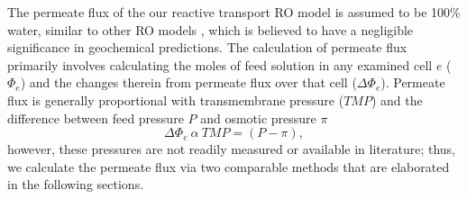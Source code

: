The permeate flux of the our reactive transport RO model is assumed to be 100\% water, similar to other RO models \cite{Li2012OptimalDesalination}, which is believed to have a negligible significance in geochemical predictions. The calculation of permeate flux primarily involves calculating the moles of feed solution in any examined cell $e$ ($\Phi_e$) and the changes therein from permeate flux over that cell ($\Delta \Phi_{e}$). Permeate flux is generally proportional with transmembrane pressure ($TMP$) and the difference between feed pressure $P$ and osmotic pressure $\pi$ \cite{VanWagner2009EffectPerformance,Schock1987MassModules,Lonsdale1965TransportMembranes}
\begin{equation} \label{pressure_differential}
    \Delta \Phi_{e} ~ \alpha ~ TMP = (P - \pi),
\end{equation} 
however, these pressures are not readily measured or available in literature; thus, we calculate the permeate flux via two comparable methods that are elaborated in the following sections.


